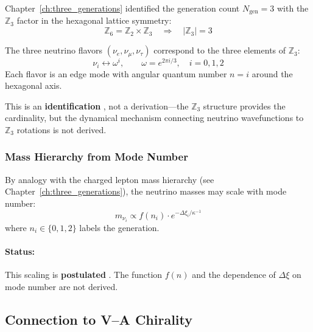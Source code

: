 Chapter~\ref{ch:three_generations} identified the generation count $N_{\text{gen}} = 3$
with the $\mathbb{Z}_3$ factor in the hexagonal lattice symmetry:
\begin{equation}
    \mathbb{Z}_6 = \mathbb{Z}_2 \times \mathbb{Z}_3
    \quad\Longrightarrow\quad
    |\mathbb{Z}_3| = 3
    \label{eq:ch6_z3}
\end{equation}

\begin{postulate}
\label{post:ch6_three_nu}
The three neutrino flavors $(\nu_e, \nu_\mu, \nu_\tau)$ correspond to the
three elements of $\mathbb{Z}_3$:
\begin{equation}
    \nu_i \leftrightarrow \omega^i, \qquad \omega = e^{2\pi i/3}, \quad i = 0, 1, 2
\end{equation}
Each flavor is an edge mode with angular quantum number $n = i$ around the
hexagonal axis.
\end{postulate}

This is an \textbf{identification} \tagI{}, not a derivation---the $\mathbb{Z}_3$
structure provides the cardinality, but the dynamical mechanism connecting
neutrino wavefunctions to $\mathbb{Z}_3$ rotations is not derived.

\subsubsection{Mass Hierarchy from Mode Number}

By analogy with the charged lepton mass hierarchy (see Chapter~\ref{ch:three_generations}),
the neutrino masses may scale with mode number:
\begin{equation}
    m_{\nu_i} \propto f(n_i) \cdot e^{-\Delta\xi_i/\kappa^{-1}}
    \label{eq:ch6_nu_hierarchy}
\end{equation}
where $n_i \in \{0, 1, 2\}$ labels the generation.

\paragraph{Status:} This scaling is \textbf{postulated} \tagP{}. The function $f(n)$
and the dependence of $\Delta\xi$ on mode number are not derived.

\subsection{Connection to V--A Chirality}
\label{sec:ch6_va_connection}

